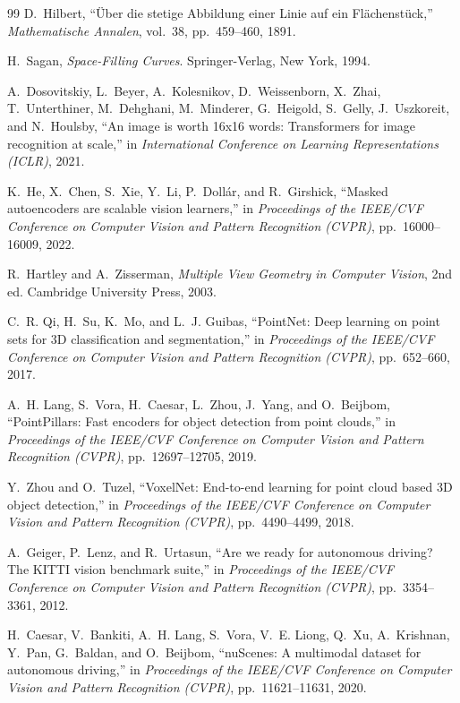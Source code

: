 \documentclass{book}
\begin{document}
\begin{thebibliography}{99}
D.~Hilbert, ``{\"U}ber die stetige Abbildung einer Linie auf ein Fl{\"a}chenst{\"u}ck,'' \textit{Mathematische Annalen}, vol.~38, pp.~459--460, 1891.
 
H.~Sagan, \textit{Space-Filling Curves}. Springer-Verlag, New York, 1994.
 
A.~Dosovitskiy, L.~Beyer, A.~Kolesnikov, D.~Weissenborn, X.~Zhai, T.~Unterthiner, M.~Dehghani, M.~Minderer, G.~Heigold, S.~Gelly, J.~Uszkoreit, and N.~Houlsby, ``An image is worth 16x16 words: Transformers for image recognition at scale,'' in \textit{International Conference on Learning Representations (ICLR)}, 2021.
 
K.~He, X.~Chen, S.~Xie, Y.~Li, P.~Doll{\'a}r, and R.~Girshick, ``Masked autoencoders are scalable vision learners,'' in \textit{Proceedings of the IEEE/CVF Conference on Computer Vision and Pattern Recognition (CVPR)}, pp.~16000--16009, 2022.
 
R.~Hartley and A.~Zisserman, \textit{Multiple View Geometry in Computer Vision}, 2nd ed. Cambridge University Press, 2003.
 
C.~R. Qi, H.~Su, K.~Mo, and L.~J. Guibas, ``PointNet: Deep learning on point sets for 3D classification and segmentation,'' in \textit{Proceedings of the IEEE/CVF Conference on Computer Vision and Pattern Recognition (CVPR)}, pp.~652--660, 2017.
 
A.~H. Lang, S.~Vora, H.~Caesar, L.~Zhou, J.~Yang, and O.~Beijbom, ``PointPillars: Fast encoders for object detection from point clouds,'' in \textit{Proceedings of the IEEE/CVF Conference on Computer Vision and Pattern Recognition (CVPR)}, pp.~12697--12705, 2019.
 
Y.~Zhou and O.~Tuzel, ``VoxelNet: End-to-end learning for point cloud based 3D object detection,'' in \textit{Proceedings of the IEEE/CVF Conference on Computer Vision and Pattern Recognition (CVPR)}, pp.~4490--4499, 2018.
 
A.~Geiger, P.~Lenz, and R.~Urtasun, ``Are we ready for autonomous driving? The KITTI vision benchmark suite,'' in \textit{Proceedings of the IEEE/CVF Conference on Computer Vision and Pattern Recognition (CVPR)}, pp.~3354--3361, 2012.
 
H.~Caesar, V.~Bankiti, A.~H. Lang, S.~Vora, V.~E. Liong, Q.~Xu, A.~Krishnan, Y.~Pan, G.~Baldan, and O.~Beijbom, ``nuScenes: A multimodal dataset for autonomous driving,'' in \textit{Proceedings of the IEEE/CVF Conference on Computer Vision and Pattern Recognition (CVPR)}, pp.~11621--11631, 2020.
 

\end{thebibliography}
\end{document}
